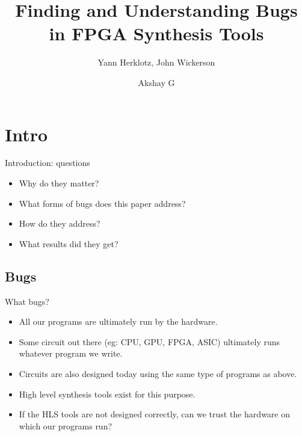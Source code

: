 \documentclass[notes, xcolor=dvipsnames]{beamer}
\title{Finding and Understanding Bugs in FPGA Synthesis Tools}
\subtitle{Yann Herklotz, John Wickerson}
\author{Akshay G}
\begin{document}
    

    \begin{frame}

        \titlepage

    \end{frame}

    \logo{}

    \section{Intro}
    \begin{frame}{Introduction: questions}

        \begin{itemize}
            \item Why do they matter? 
            \item What forms of bugs does this paper address? 
            \item How do they address? 
            \item What results did they get?  
        \end{itemize}
        
    \end{frame}

    \subsection{Bugs}
    \begin{frame}{What bugs?}

        \begin{itemize}
            \item All our programs are ultimately run by the hardware. 
            \item Some circuit out there (eg: CPU, GPU, FPGA, ASIC) ultimately runs whatever program we write. 
            \item Circuits are also designed today using the same type of programs as above.
            \item High level synthesis tools exist for this purpose. 
            \item If the HLS tools are not designed correctly, can we trust the hardware on which our programs run? 
        \end{itemize}
        
    \end{frame}

\end{document}
